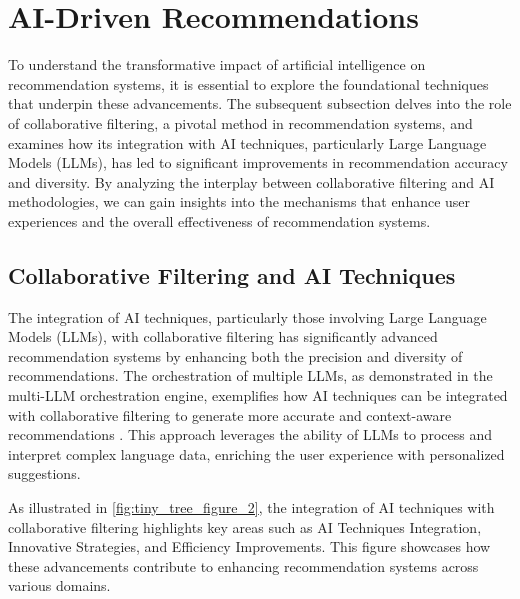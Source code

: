 




\section{AI-Driven Recommendations} \label{sec:AI-Driven Recommendations}

To understand the transformative impact of artificial intelligence on recommendation systems, it is essential to explore the foundational techniques that underpin these advancements. The subsequent subsection delves into the role of collaborative filtering, a pivotal method in recommendation systems, and examines how its integration with AI techniques, particularly Large Language Models (LLMs), has led to significant improvements in recommendation accuracy and diversity. By analyzing the interplay between collaborative filtering and AI methodologies, we can gain insights into the mechanisms that enhance user experiences and the overall effectiveness of recommendation systems.






\subsection{Collaborative Filtering and AI Techniques} \label{subsec:Collaborative Filtering and AI Techniques}

The integration of AI techniques, particularly those involving Large Language Models (LLMs), with collaborative filtering has significantly advanced recommendation systems by enhancing both the precision and diversity of recommendations. The orchestration of multiple LLMs, as demonstrated in the multi-LLM orchestration engine, exemplifies how AI techniques can be integrated with collaborative filtering to generate more accurate and context-aware recommendations \cite{rasal2024multillmorchestrationenginepersonalized}. This approach leverages the ability of LLMs to process and interpret complex language data, enriching the user experience with personalized suggestions.

As illustrated in \autoref{fig:tiny_tree_figure_2}, the integration of AI techniques with collaborative filtering highlights key areas such as AI Techniques Integration, Innovative Strategies, and Efficiency Improvements. This figure showcases how these advancements contribute to enhancing recommendation systems across various domains.

